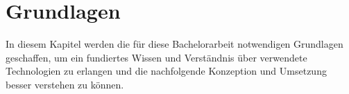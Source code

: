 
\chapter{Grundlagen}
\label{chap:Grundlagen}
In diesem Kapitel werden die für diese Bachelorarbeit notwendigen Grundlagen geschaffen, um ein fundiertes Wissen und Verständnis 
über verwendete Technologien zu erlangen und die nachfolgende Konzeption und Umsetzung besser verstehen zu können. %


